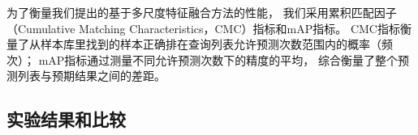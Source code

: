 为了衡量我们提出的基于多尺度特征融合方法的性能，
我们采用累积匹配因子（Cumulative Matching Characteristics，CMC）指标和mAP指标。
CMC指标衡量了从样本库里找到的样本正确排在查询列表允许预测次数范围内的概率（频次）；
mAP指标通过测量不同允许预测次数下的精度的平均，
综合衡量了整个预测列表与预期结果之间的差距。


\subsection{实验结果和比较}


